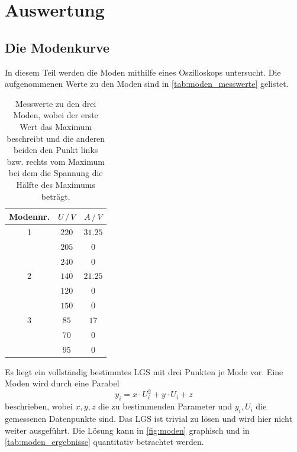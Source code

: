 \section{Auswertung}
\label{sec:Auswertung}

\subsection{Die Modenkurve}
\label{sec:ausw_moden}
In diesem Teil werden die Moden mithilfe eines Oszilloskops untersucht.
Die aufgenommenen Werte zu den Moden sind in \autoref{tab:moden_messwerte} gelistet.
\begin{table}
    \centering
    \caption{Messwerte zu den drei Moden, wobei der erste Wert das Maximum beschreibt und die anderen beiden den Punkt links bzw. rechts vom Maximum bei dem die Spannung die Hälfte des Maximums beträgt.}
    \begin{tabular}{c c c}
        \toprule
        Modennr. & $U \,/\, V$ & $A \,/\, V$ \\
        \midrule
        1 & $220$ & $31.25$ \\
        & $205$ & $0$ \\
        & $240$ & $0$ \\
        \hline
        2 & $140$ & $21.25$ \\
        & $120$ & $0$ \\
        & $150$ & $0$ \\
        \hline
        3 & $85$ & $17$ \\
        & $70$ & $0$ \\
        & $95$ & $0$ \\
        \bottomrule
    \end{tabular}
    \label{tab:moden_messwerte}
\end{table}
\FloatBarrier
Es liegt ein vollständig bestimmtes LGS mit drei Punkten je Mode vor.
Eine Moden wird durch eine Parabel
\begin{equation*}
    y_i = x \cdot U_i^2 + y \cdot U_i + z
\end{equation*}
beschrieben, wobei $x, y, z$ die zu bestimmenden Parameter und $y_i, U_i$ die gemessenen Datenpunkte sind.
Das LGS ist trivial zu lösen und wird hier nicht weiter ausgeführt.
Die Lösung kann in \autoref{fig:moden} graphisch und in \autoref{tab:moden_ergebnisse} quantitativ betrachtet werden.
